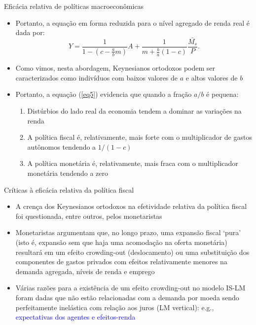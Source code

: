 \documentclass[10pt]{beamer}
\begin{document}
\begin{frame}{Eficácia relativa de políticas macroeconômicas}
    \begin{itemize}
        \item Portanto, a equação em forma reduzida para o nível agregado de renda real é dada por:
        \begin{equation}
            Y = \frac{1}{1 - \left(c - \frac{a}{b}m \right)}A + \frac{1}{m + \frac{b}{a}(1-c)} \frac{\bar{M_s}}{P}.
            \label{eq5}
        \end{equation}
        \bigskip
        \item Como vimos, nesta abordagem, Keynesianos ortodoxos podem ser caracterizados como indivíduos com baixos valores de $a$ e altos valores de $b$
        \bigskip
        \item Portanto, a equação (\ref{eq5}) evidencia que quando a fração $a/b$ é pequena:
        \bigskip
        \begin{enumerate}
            \item Distúrbios do lado real da economia tendem a dominar as variações na renda
            \medskip
            \item A política fiscal é, relativamente, mais forte com o multiplicador de gastos autônomos tendendo a $1/(1-c)$
            \bigskip
            \item A política monetária é, relativamente, mais fraca com o multiplicador monetária tendendo a zero
        \end{enumerate}
    \end{itemize}
\end{frame}

\begin{frame}{Críticas à eficácia relativa da política fiscal}
    \begin{itemize}
        \item A crença dos Keynesianos ortodoxos na efetividade relativa da política fiscal foi questionada, entre outros, pelos monetaristas
        \bigskip
        \item Monetaristas argumentam que, no longo prazo, uma expansão fiscal `pura' (isto é, expansão sem que haja uma acomodação na oferta monetária) resultará em um efeito crowding-out (deslocamento) ou uma substituição dos componentes de gastos privados com efeitos relativamente menores na demanda agregada, níveis de renda e emprego
        \bigskip
        \item Várias razões para a existência de um efeito crowding-out no modelo IS-LM foram dadas que não estão relacionadas com a demanda por moeda sendo perfeitamente inelástica com relação aos juros (LM vertical): e.g., \textcolor{blue}{expectativas dos agentes e efeitos-renda}
    \end{itemize}
\end{frame}
\end{document}
